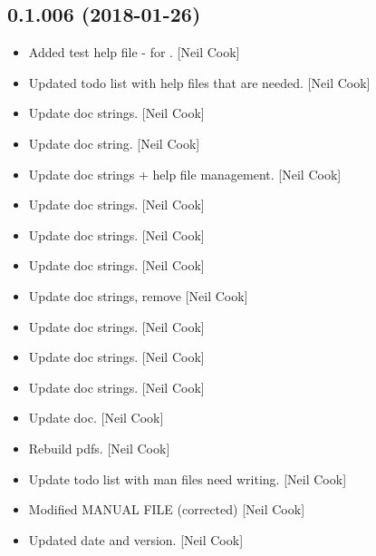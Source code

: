 \documentclass[a4paper,10pt,english]{report}
\begin{document}
\subsection{0.1.006 (2018-01-26)}
\label{\detokenize{misc/changelog:id498}}\begin{itemize}
\item {} 
Added test help file - for . {[}Neil Cook{]}

\item {} 
Updated todo list with help files that are needed. {[}Neil Cook{]}

\item {} 
Update doc strings. {[}Neil Cook{]}

\item {} 
Update doc string. {[}Neil Cook{]}

\item {} 
Update doc strings + help file management. {[}Neil Cook{]}

\item {} 
Update doc strings. {[}Neil Cook{]}

\item {} 
Update doc strings. {[}Neil Cook{]}

\item {} 
Update doc strings. {[}Neil Cook{]}

\item {} 
Update doc strings, remove  {[}Neil Cook{]}

\item {} 
Update doc strings. {[}Neil Cook{]}

\item {} 
Update doc strings. {[}Neil Cook{]}

\item {} 
Update doc strings. {[}Neil Cook{]}

\item {} 
Update doc. {[}Neil Cook{]}

\item {} 
Rebuild pdfs. {[}Neil Cook{]}

\item {} 
Update todo list with man files need writing. {[}Neil Cook{]}

\item {} 
Modified MANUAL FILE (corrected) {[}Neil Cook{]}

\item {} 
Updated date and version. {[}Neil Cook{]}


\end{itemize}
\end{document}
